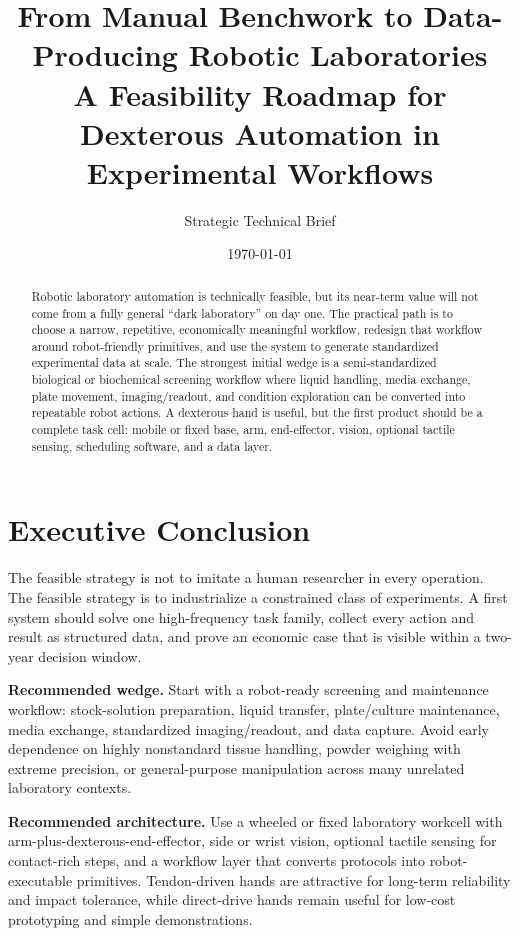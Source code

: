 \documentclass[11pt]{article}
\title{\vspace{-1.4cm}\textbf{From Manual Benchwork to Data-Producing Robotic Laboratories}\\
\large A Feasibility Roadmap for Dexterous Automation in Experimental Workflows}
\author{Strategic Technical Brief}
\date{\today}
\begin{document}
\maketitle
\vspace{-0.8em}

\begin{abstract}
Robotic laboratory automation is technically feasible, but its near-term value will not come from a fully general ``dark laboratory'' on day one. The practical path is to choose a narrow, repetitive, economically meaningful workflow, redesign that workflow around robot-friendly primitives, and use the system to generate standardized experimental data at scale. The strongest initial wedge is a semi-standardized biological or biochemical screening workflow where liquid handling, media exchange, plate movement, imaging/readout, and condition exploration can be converted into repeatable robot actions. A dexterous hand is useful, but the first product should be a complete task cell: mobile or fixed base, arm, end-effector, vision, optional tactile sensing, scheduling software, and a data layer.
\end{abstract}

\section{Executive Conclusion}

The feasible strategy is not to imitate a human researcher in every operation. The feasible strategy is to industrialize a constrained class of experiments. A first system should solve one high-frequency task family, collect every action and result as structured data, and prove an economic case that is visible within a two-year decision window.

\textbf{Recommended wedge.} Start with a robot-ready screening and maintenance workflow: stock-solution preparation, liquid transfer, plate/culture maintenance, media exchange, standardized imaging/readout, and data capture. Avoid early dependence on highly nonstandard tissue handling, powder weighing with extreme precision, or general-purpose manipulation across many unrelated laboratory contexts.

\textbf{Recommended architecture.} Use a wheeled or fixed laboratory workcell with arm-plus-dexterous-end-effector, side or wrist vision, optional tactile sensing for contact-rich steps, and a workflow layer that converts protocols into robot-executable primitives. Tendon-driven hands are attractive for long-term reliability and impact tolerance, while direct-drive hands remain useful for low-cost prototyping and simple demonstrations.
\end{document}
